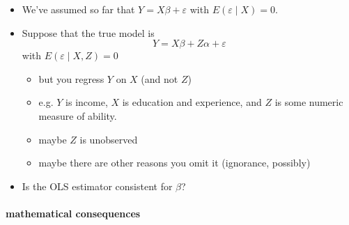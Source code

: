 \begin{itemize}
\item We've assumed so far that $Y = X\beta + \varepsilon$
        with $E(\varepsilon \mid X) = 0$.
\item Suppose that the true model is
        \[ Y = X\beta + Z\alpha + \varepsilon \] with $E(\varepsilon
        \mid X, Z) = 0$
\begin{itemize}
\item but you regress $Y$ on $X$ (and not $Z$)
\item e.g. $Y$ is income, $X$ is education and experience, and
          $Z$ is some numeric measure of ability.
\item maybe $Z$ is unobserved
\item maybe there are other reasons you omit it (ignorance, possibly)
\end{itemize}
\item Is the OLS estimator consistent for $\beta$?
\end{itemize}
\paragraph{mathematical consequences}
\label{sec-2-1-1-1}

